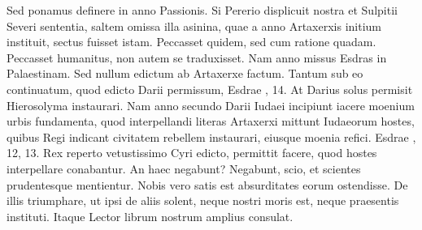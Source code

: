 Sed
ponamus definere in anno Passionis.
Si Pererio displicuit nostra et
Sulpitii Severi sententia, saltem omissa illa asinina, quae a  anno
Artaxerxis initium instituit, sectus fuisset istam.
Peccasset quidem,
sed cum ratione quadam.
Peccasset humanitus, non autem
se traduxisset.
Nam  anno missus Esdras in Palaestinam.
Sed nullum edictum ab Artaxerxe factum. Tantum sub eo continuatum,
quod edicto Darii permissum, Esdrae , 14.
At Darius
solus permisit Hierosolyma instaurari.
Nam anno secundo Darii
Iudaei incipiunt iacere moenium urbis fundamenta, quod interpellandi
literas Artaxerxi mittunt Iudaeorum hostes, quibus Regi indicant
civitatem rebellem instaurari, eiusque moenia refici.
Esdrae , 12, 13.
Rex reperto vetustissimo Cyri edicto, permittit facere,
quod hostes interpellare conabantur.
An haec negabunt?
Negabunt, scio, et scientes prudentesque mentientur.
Nobis vero satis
est absurditates eorum ostendisse.
De illis triumphare, ut ipsi de
aliis solent, neque nostri moris est, neque praesentis instituti.
Itaque
Lector  librum nostrum amplius consulat.

